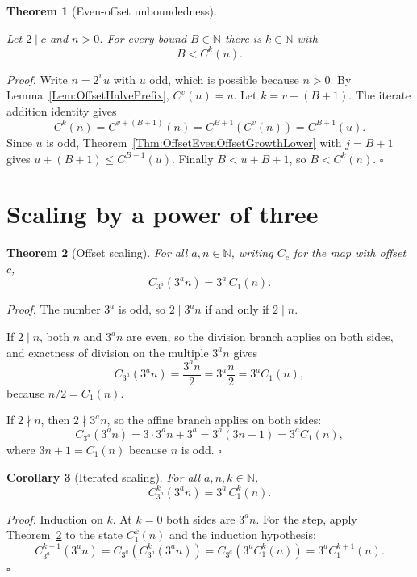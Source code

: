 \documentclass[11pt,letterpaper]{article}
\newcommand{\N}{\mathbb{N}}
\newtheorem{theorem}{Theorem}
\newtheorem{corollary}[theorem]{Corollary}
\newenvironment{proof}{\noindent\textit{Proof.}}{\hfill\(\square\)}
\begin{document}
\begin{theorem}[Even-offset unboundedness]\label{Thm:OffsetEvenOffsetUnbounded}
\leavevmode\par
Let $2\mid c$ and $n>0$. For every bound $B\in\N$ there is $k\in\N$ with
\[
 B<C^{k}(n).
\]
\end{theorem}

\begin{proof}
Write $n=2^{v}u$ with $u$ odd, which is possible because $n>0$. By
Lemma~\ref{Lem:OffsetHalvePrefix}, $C^{v}(n)=u$. Let $k=v+(B+1)$. The iterate
addition identity gives
\[
 C^{k}(n)=C^{v+(B+1)}(n)=C^{B+1}\left(C^{v}(n)\right)=C^{B+1}(u).
\]
Since $u$ is odd, Theorem~\ref{Thm:OffsetEvenOffsetGrowthLower} with $j=B+1$
gives $u+(B+1)\le C^{B+1}(u)$. Finally $B<u+B+1$, so $B<C^{k}(n)$.
\end{proof}

\section{Scaling by a power of three}

\begin{theorem}[Offset scaling]\label{Thm:OffsetStepScaling}
For all $a,n\in\N$, writing $C_{c}$ for the map with offset $c$,
\[
 C_{3^{a}}\left(3^{a}n\right)=3^{a}\,C_{1}(n).
\]
\end{theorem}

\begin{proof}
The number $3^{a}$ is odd, so $2\mid 3^{a}n$ if and only if $2\mid n$.

If $2\mid n$, both $n$ and $3^{a}n$ are even, so the division branch applies on
both sides, and exactness of division on the multiple $3^{a}n$ gives
\[
 C_{3^{a}}\left(3^{a}n\right)=\frac{3^{a}n}{2}=3^{a}\frac{n}{2}
 =3^{a}C_{1}(n),
\]
because $n/2=C_{1}(n)$.

If $2\nmid n$, then $2\nmid 3^{a}n$, so the affine branch applies on both
sides:
\[
 C_{3^{a}}\left(3^{a}n\right)=3\cdot3^{a}n+3^{a}=3^{a}(3n+1)=3^{a}C_{1}(n),
\]
where $3n+1=C_{1}(n)$ because $n$ is odd.
\end{proof}

\begin{corollary}[Iterated scaling]\label{Cor:OffsetIterateScaling}
For all $a,n,k\in\N$,
\[
 C_{3^{a}}^{k}\left(3^{a}n\right)=3^{a}\,C_{1}^{k}(n).
\]
\end{corollary}

\begin{proof}
Induction on $k$. At $k=0$ both sides are $3^{a}n$. For the step, apply
Theorem~\ref{Thm:OffsetStepScaling} to the state $C_{1}^{k}(n)$ and the
induction hypothesis:
\[
 C_{3^{a}}^{k+1}\left(3^{a}n\right)
 =C_{3^{a}}\left(C_{3^{a}}^{k}\left(3^{a}n\right)\right)
 =C_{3^{a}}\left(3^{a}C_{1}^{k}(n)\right)
 =3^{a}C_{1}^{k+1}(n).
\]
\end{proof}
\end{document}
